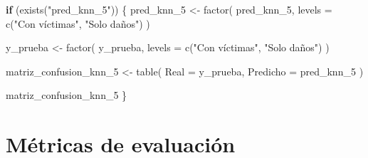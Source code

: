\documentclass[
  11pt,
  letterpaper,
]{book}
\newenvironment{Shaded}{\begin{snugshade}}{\end{snugshade}}
\newcommand{\AttributeTok}[1]{\textcolor[rgb]{0.40,0.45,0.13}{#1}}
\newcommand{\ControlFlowTok}[1]{\textcolor[rgb]{0.00,0.23,0.31}{\textbf{#1}}}
\newcommand{\FunctionTok}[1]{\textcolor[rgb]{0.28,0.35,0.67}{#1}}
\newcommand{\NormalTok}[1]{\textcolor[rgb]{0.00,0.23,0.31}{#1}}
\newcommand{\OtherTok}[1]{\textcolor[rgb]{0.00,0.23,0.31}{#1}}
\newcommand{\StringTok}[1]{\textcolor[rgb]{0.13,0.47,0.30}{#1}}
\begin{document}
\begin{Shaded}
\begin{Highlighting}[]
\ControlFlowTok{if}\NormalTok{ (}\FunctionTok{exists}\NormalTok{(}\StringTok{"pred\_knn\_5"}\NormalTok{)) \{}
\NormalTok{  pred\_knn\_5 }\OtherTok{\textless{}{-}} \FunctionTok{factor}\NormalTok{(}
\NormalTok{    pred\_knn\_5,}
    \AttributeTok{levels =} \FunctionTok{c}\NormalTok{(}\StringTok{"Con víctimas"}\NormalTok{, }\StringTok{"Solo daños"}\NormalTok{)}
\NormalTok{  )}

\NormalTok{  y\_prueba }\OtherTok{\textless{}{-}} \FunctionTok{factor}\NormalTok{(}
\NormalTok{    y\_prueba,}
    \AttributeTok{levels =} \FunctionTok{c}\NormalTok{(}\StringTok{"Con víctimas"}\NormalTok{, }\StringTok{"Solo daños"}\NormalTok{)}
\NormalTok{  )}

\NormalTok{  matriz\_confusion\_knn\_5 }\OtherTok{\textless{}{-}} \FunctionTok{table}\NormalTok{(}
    \AttributeTok{Real =}\NormalTok{ y\_prueba,}
    \AttributeTok{Predicho =}\NormalTok{ pred\_knn\_5}
\NormalTok{  )}

\NormalTok{  matriz\_confusion\_knn\_5}
\NormalTok{\}}
\end{Highlighting}
\end{Shaded}

\section{Métricas de evaluación}\label{muxe9tricas-de-evaluaciuxf3n-1}
\end{document}

